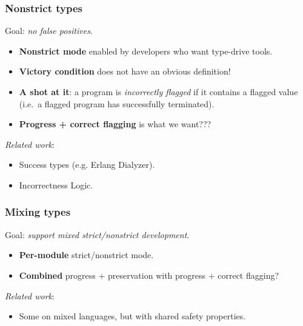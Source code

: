 \documentclass[aspectratio=169]{beamer}
\begin{document}
\begin{frame}

\frametitle{Nonstrict types}

Goal: \emph{no false positives}.

\begin{itemize}
\item \textbf{Nonstrict mode} enabled by developers who want type-drive tools.
\item \textbf{Victory condition} does not have an obvious definition!
\item \textbf{A shot at it}: a program is \emph{incorrectly flagged} if it contains
  a flagged value (i.e.~a flagged program has successfully terminated).
\item \textbf{Progress + correct flagging} is what we want???
\end{itemize}

\emph{Related work}:
\begin{itemize}
\item Success types (e.g. Erlang Dialyzer).
\item Incorrectness Logic.
\end{itemize}

\end{frame}

\begin{frame}

\frametitle{Mixing types}

Goal: \emph{support mixed strict/nonstrict development}.

\begin{itemize}
\item \textbf{Per-module} strict/nonstrict mode.
\item \textbf{Combined} progress + preservation with progress + correct flagging?
\end{itemize}

\emph{Related work}:
\begin{itemize}
\item Some on mixed languages, but with shared safety properties.
\end{itemize}
  
\end{frame}
\end{document}
